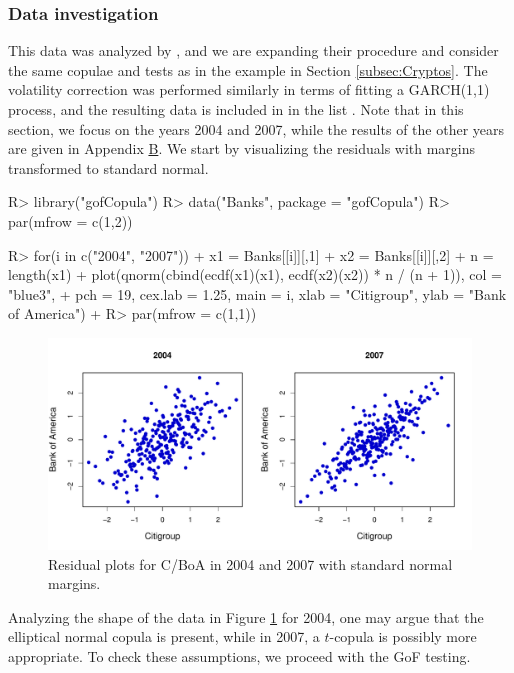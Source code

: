 \subsubsection{Data investigation}
\mycolor This data was analyzed by \citet{zhang_okhrin_song_zhou_2016}, and we are expanding their procedure and consider the same copulae and tests as in the example in Section \ref{subsec:Cryptos}. The volatility correction was performed similarly in terms of fitting a GARCH(1,1) process, and the resulting data is included in  in the list . \bk Note that in this section, we focus on the years 2004 and 2007, while the results of the other years are given in Appendix \hyperref[sec:AppendixStock]{B}. We start by visualizing the residuals with margins transformed to standard normal.
\mycolor
\begin{example}
R> library("gofCopula")
R> data("Banks", package = "gofCopula")
R> par(mfrow = c(1,2))

R> for(i in c("2004", "2007")){
+     x1 = Banks[[i]][,1]
+     x2 = Banks[[i]][,2]
+      n = length(x1)
+     plot(qnorm(cbind(ecdf(x1)(x1), ecdf(x2)(x2)) * n / (n + 1)), col = "blue3", 
+     pch = 19, cex.lab = 1.25, main = i, xlab = "Citigroup", ylab = "Bank of America")
+  }
R> par(mfrow = c(1,1))
\end{example}
\bk
\begin{figure}[H]
	\centering
 \includegraphics[width=\textwidth]{img/C_BoA_Residuals.pdf}
	\caption{Residual plots for C/BoA in 2004 and 2007 with standard normal margins.}
	\label{Residuals_C_BoA}
\end{figure}

Analyzing the shape of the data in Figure \ref{Residuals_C_BoA} for 2004, one may argue that the elliptical normal copula is present, while in 2007, a $t$-copula is possibly more appropriate. To check these assumptions, we proceed with the GoF testing.

